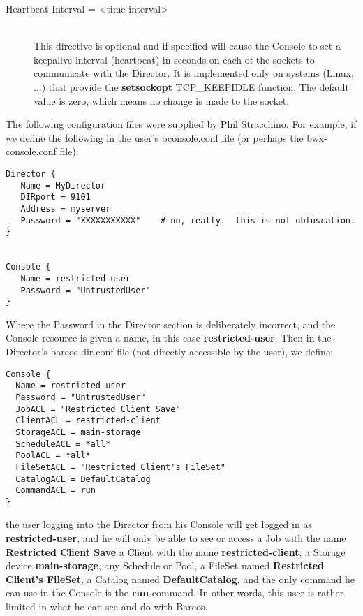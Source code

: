 \begin{description}
\item [Heartbeat Interval = {\textless}time-interval{\textgreater}] \hfill \\
This directive is optional and if specified will cause the Console to
set a keepalive interval (heartbeat) in seconds on each of the sockets
to communicate with the Director.  It is implemented only on systems
(Linux, ...) that provide the {\bf setsockopt} TCP\_KEEPIDLE function.
The default value is zero, which means no change is made to the socket.
\end{description}

The following configuration files were supplied by Phil Stracchino. For
example, if we define the following in the user's bconsole.conf file (or
perhaps the bwx-console.conf file):

\footnotesize
\begin{verbatim}
Director {
   Name = MyDirector
   DIRport = 9101
   Address = myserver
   Password = "XXXXXXXXXXX"    # no, really.  this is not obfuscation.
}


Console {
   Name = restricted-user
   Password = "UntrustedUser"
}
\end{verbatim}
\normalsize

Where the Password in the Director section is deliberately incorrect, and the
Console resource is given a name, in this case {\bf restricted-user}. Then
in the Director's bareos-dir.conf file (not directly accessible by the user),
we define:

\footnotesize
\begin{verbatim}
Console {
  Name = restricted-user
  Password = "UntrustedUser"
  JobACL = "Restricted Client Save"
  ClientACL = restricted-client
  StorageACL = main-storage
  ScheduleACL = *all*
  PoolACL = *all*
  FileSetACL = "Restricted Client's FileSet"
  CatalogACL = DefaultCatalog
  CommandACL = run
}
\end{verbatim}
\normalsize

the user logging into the Director from his Console will get logged in as {\bf
restricted-user}, and he will only be able to see or access a Job with the
name {\bf Restricted Client Save} a Client with the name {\bf
restricted-client}, a Storage device {\bf main-storage}, any Schedule or Pool,
a FileSet named {\bf Restricted Client's FileSet}, a Catalog named {\bf
DefaultCatalog}, and the only command he can use in the Console is the {\bf
run} command. In other words, this user is rather limited in what he can see
and do with Bareos.


